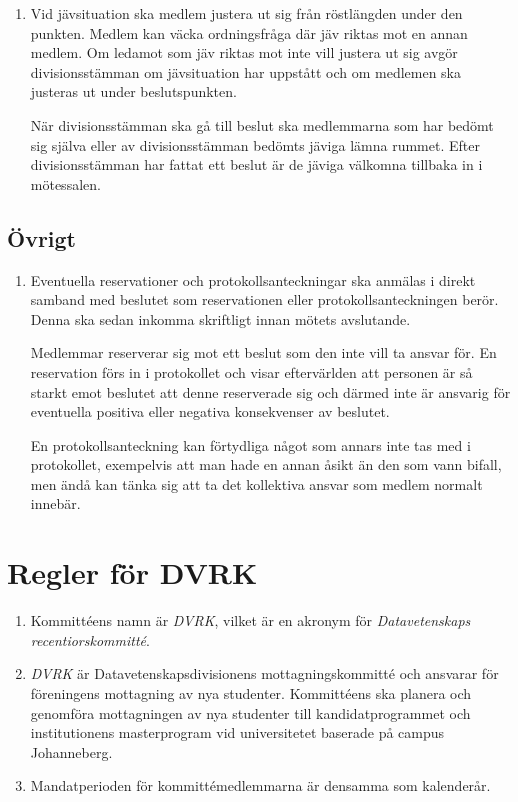 \documentclass{dvd}
\begin{document}
	\begin{enumerate}[label=\arabic* §, ref=\arabic*]
		\item Vid jävsituation ska medlem justera ut sig från röstlängden under den punkten.
		Medlem kan väcka ordningsfråga där jäv riktas mot en annan medlem.
		Om ledamot som jäv riktas mot inte vill justera ut sig avgör divisionsstämman om jävsituation har uppstått och om medlemen ska justeras ut under beslutspunkten.

		När divisionsstämman ska gå till beslut ska medlemmarna som har bedömt sig själva eller av divisionsstämman bedömts jäviga lämna rummet.
		Efter divisionsstämman har fattat ett beslut är de jäviga välkomna tillbaka in i mötessalen.
	\end{enumerate}

	\subsection{Övrigt}

	\begin{enumerate}[label=\arabic* §, ref=\arabic*]
		\item Eventuella reservationer och protokollsanteckningar ska anmälas i direkt samband med beslutet som reservationen eller protokollsanteckningen berör.
		Denna ska sedan inkomma skriftligt innan mötets avslutande.

		Medlemmar reserverar sig mot ett beslut som den inte vill ta ansvar för.
		En reservation förs in i protokollet och visar eftervärlden att personen är så starkt emot beslutet att denne reserverade sig och därmed inte är ansvarig för eventuella positiva eller negativa konsekvenser av beslutet.

		En protokollsanteckning kan förtydliga något som annars inte tas med i protokollet, exempelvis att man hade en annan åsikt än den som vann bifall, men ändå kan tänka sig att ta det kollektiva ansvar som medlem normalt innebär.
	\end{enumerate}


\section{Regler för DVRK}

	\begin{enumerate}[label=\arabic* §, ref=\arabic*]
		\item Kommittéens namn är \emph{DVRK}, vilket är en akronym för \emph{Datavetenskaps recentiorskommitté}.

		\item \emph{DVRK} är Datavetenskapsdivisionens mottagningskommitté och ansvarar för föreningens mottagning av nya studenter.
		Kommittéens ska planera och genomföra mottagningen av nya studenter till kandidatprogrammet och institutionens masterprogram vid universitetet baserade på campus Johanneberg.

		\item Mandatperioden för kommittémedlemmarna är densamma som kalenderår.

	\end{enumerate}
\end{document}
